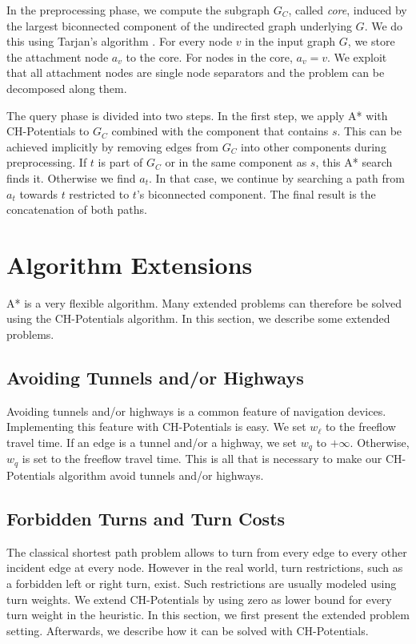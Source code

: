 \documentclass[letterpaper]{article} %
\begin{document}
In the preprocessing phase, we compute the subgraph $G_C$, called \emph{core}, induced by the largest biconnected component of the undirected graph underlying $G$.
We do this using Tarjan's algorithm \cite{t-dfslg2-72}.
For every node $v$ in the input graph $G$, we store the attachment node $a_v$ to the core.
For nodes in the core, $a_v=v$.
We exploit that all attachment nodes are single node separators and the problem can be decomposed along them.

The query phase is divided into two steps.
In the first step, we apply A* with CH-Potentials to $G_C$ combined with the component that contains $s$.
This can be achieved implicitly by removing edges from $G_C$ into other components during preprocessing.
If $t$ is part of $G_C$ or in the same component as $s$, this A* search finds it.
Otherwise we find $a_t$.
In that case, we continue by searching a path from $a_t$ towards $t$ restricted to $t$'s biconnected component.
The final result is the concatenation of both paths.

\section{Algorithm Extensions}
\label{sec:extensions}

A* is a very flexible algorithm.
Many extended problems can therefore be solved using the CH-Potentials algorithm.
In this section, we describe some extended problems.

\subsection{Avoiding Tunnels and/or Highways}
\label{sec:no-tunnel-highway}

Avoiding tunnels and/or highways is a common feature of navigation devices.
Implementing this feature with CH-Potentials is easy.
We set $w_\ell$ to the freeflow travel time.
If an edge is a tunnel and/or a highway, we set $w_q$ to $+\infty$.
Otherwise, $w_q$ is set to the freeflow travel time.
This is all that is necessary to make our CH-Potentials algorithm avoid tunnels and/or highways.

\subsection{Forbidden Turns and Turn Costs}
\label{sec:no-turns}

The classical shortest path problem allows to turn from every edge to every other incident edge at every node.
However in the real world, turn restrictions, such as a forbidden left or right turn, exist.
Such restrictions are usually modeled using turn weights.
We extend CH-Potentials by using zero as lower bound for every turn weight in the heuristic.
In this section, we first present the extended problem setting.
Afterwards, we describe how it can be solved with CH-Potentials.
\end{document}
